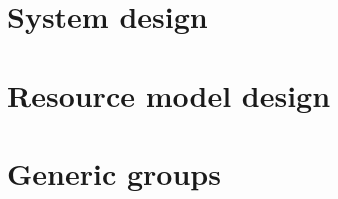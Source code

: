 

\section{System design} \label{system_design}


\section{Resource model design} \label{model_design}


\section{Generic groups} \label{generic_groups}
